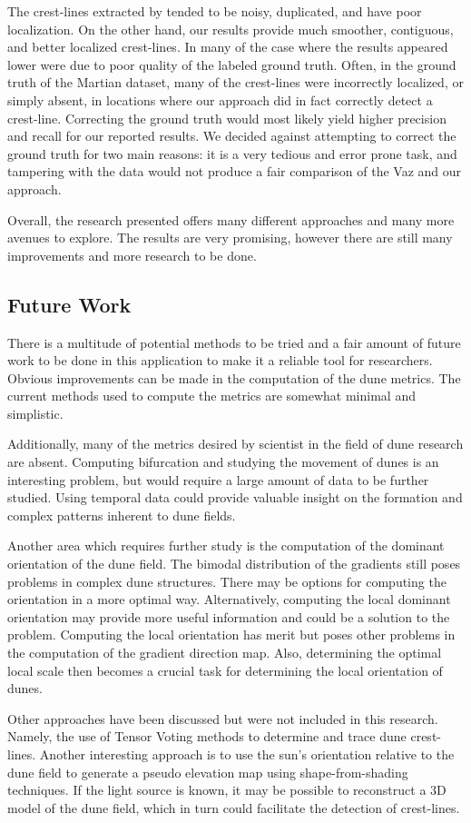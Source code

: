The crest-lines extracted by \cite{vaz_object_based_dune_analysis} tended to be noisy, duplicated, and have poor localization. On the other hand, our results provide much smoother, contiguous, and better localized crest-lines. In many of the case where the results appeared lower were due to poor quality of the labeled ground truth. Often, in the ground truth of the Martian dataset, many of the crest-lines were incorrectly localized, or simply absent, in locations where our approach did in fact correctly detect a crest-line. Correcting the ground truth would most likely yield higher precision and recall for our reported results. We decided against attempting to correct the ground truth for two main reasons: it is a very tedious and error prone task, and tampering with the data would not produce a fair comparison of the Vaz \cite{vaz_object_based_dune_analysis} and our approach.

Overall, the research presented offers many different approaches and many more avenues to explore. The results are very promising, however there are still many improvements and more research to be done. 

\subsection{Future Work}

There is a multitude of potential methods to be tried and a fair amount of future work to be done in this application to make it a reliable tool for researchers. Obvious improvements can be made in the computation of the dune metrics. The current methods used to compute the metrics are somewhat minimal and simplistic. 

Additionally, many of the metrics desired by scientist in the field of dune research are absent. Computing bifurcation and studying the movement of dunes is an interesting problem, but would require a large amount of data to be further studied. Using temporal data could provide valuable insight on the formation and complex patterns inherent to dune fields.

Another area which requires further study is the computation of the dominant orientation of the dune field. The bimodal distribution of the gradients still poses problems in complex dune structures. There may be options for computing the orientation in a more optimal way. Alternatively, computing the local dominant orientation may provide more useful information and could be a solution to the problem. Computing the local orientation has merit but poses other problems in the computation of the gradient direction map. Also, determining the optimal local scale then becomes a crucial task for determining the local orientation of dunes.

Other approaches have been discussed but were not included in this research. Namely, the use of Tensor Voting methods to determine and trace dune crest-lines. Another interesting approach is to use the sun's orientation relative to the dune field to generate a pseudo elevation map using shape-from-shading techniques. If the light source is known, it may be possible to reconstruct a 3D model of the dune field, which in turn could facilitate the detection of crest-lines.